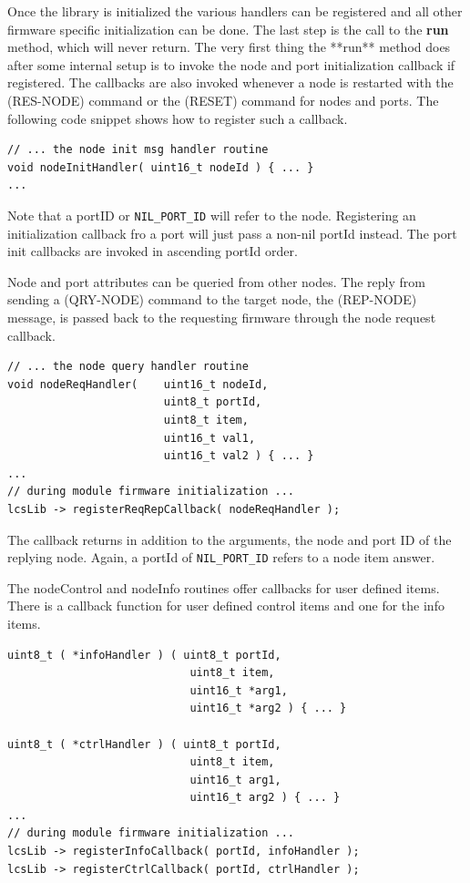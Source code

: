 Once the library is initialized the various handlers can be registered and all other firmware specific initialization can be done. The last step is the call to the \textbf{run} method, which will never return. The very first thing the **run** method does after some internal setup is to invoke the node and port initialization callback if registered. The callbacks are also invoked whenever a node is restarted with the (RES-NODE) command or the (RESET) command for nodes and ports. The following code snippet shows how to register such a callback.

\lstset{style=codesnippetstyle}
\begin{lstlisting}
// ... the node init msg handler routine
void nodeInitHandler( uint16_t nodeId ) { ... }
...
\end{lstlisting}

Note that a portID or \texttt{NIL\_PORT\_ID} will refer to the node. Registering an initialization callback fro a port will just pass a non-nil portId instead. The port init callbacks are invoked in ascending portId order.


Node and port attributes can be queried from other nodes. The reply from sending a (QRY-NODE) command to the target node, the (REP-NODE) message, is passed back to the requesting firmware through the node request callback.

\lstset{style=codesnippetstyle}
\begin{lstlisting}
// ... the node query handler routine
void nodeReqHandler(    uint16_t nodeId, 
                        uint8_t portId, 
                        uint8_t item, 
                        uint16_t val1, 
                        uint16_t val2 ) { ... }
...
// during module firmware initialization ...
lcsLib -> registerReqRepCallback( nodeReqHandler );
\end{lstlisting}

The callback returns in addition to the arguments, the node and port ID of the replying node. Again, a portId of \texttt{NIL\_PORT\_ID} refers to a node item answer.


The nodeControl and nodeInfo routines offer callbacks for user defined items. There is a callback function for user defined control items and one for the info items.

\lstset{style=codesnippetstyle}
\begin{lstlisting}
uint8_t ( *infoHandler ) ( uint8_t portId, 
                            uint8_t item, 
                            uint16_t *arg1, 
                            uint16_t *arg2 ) { ... }

uint8_t ( *ctrlHandler ) ( uint8_t portId, 
                            uint8_t item, 
                            uint16_t arg1, 
                            uint16_t arg2 ) { ... }
...
// during module firmware initialization ...
lcsLib -> registerInfoCallback( portId, infoHandler );
lcsLib -> registerCtrlCallback( portId, ctrlHandler );
\end{lstlisting}

